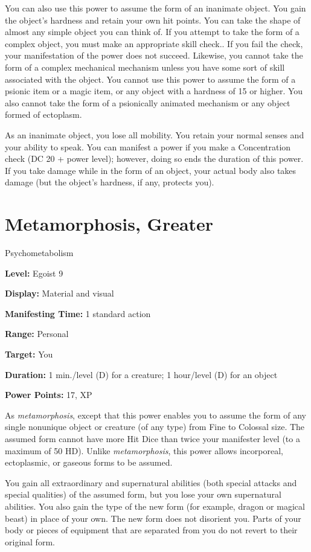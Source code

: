 \documentclass{article}
\begin{document}
You can also use this power to assume the form of an inanimate object. You gain 
the object's hardness and retain your own hit points. You can take the shape of 
almost any simple object you can think of. If you attempt to take the form of a 
complex object, you must make an appropriate skill check.. If you fail the check, 
your manifestation of the power does not succeed. Likewise, you cannot take the 
form of a complex mechanical mechanism unless you have some sort of skill associated 
with the object. You cannot use this power to assume the form of a psionic item 
or a magic item, or any object with a hardness of 15 or higher. You also cannot 
take the form of a psionically animated mechanism or any object formed of ectoplasm.

As an inanimate object, you lose all mobility. You retain your normal senses and 
your ability to speak. You can manifest a power if you make a Concentration check 
(DC 20 + power level); however, doing so ends the duration of this power. If you 
take damage while in the form of an object, your actual body also takes damage 
(but the object's hardness, if any, protects you).

\vspace{12pt}
\section*{Metamorphosis, Greater}

Psychometabolism

\textbf{Level:} Egoist 9

\textbf{Display:} Material and visual

\textbf{Manifesting Time:} 1 standard action

\textbf{Range:} Personal

\textbf{Target:} You

\textbf{Duration:} 1 min./level (D) for a creature; 1 hour/level (D) for an object

\textbf{Power Points:} 17, XP

As \textit{metamorphosis}, except that this power enables you to assume the form 
of any single nonunique object or creature (of any type) from Fine to Colossal 
size. The assumed form cannot have more Hit Dice than twice your manifester level 
(to a maximum of 50 HD). Unlike \textit{metamorphosis}, this power allows incorporeal, 
ectoplasmic, or gaseous forms to be assumed.

You gain all extraordinary and supernatural abilities (both special attacks and 
special qualities) of the assumed form, but you lose your own supernatural abilities. 
You also gain the type of the new form (for example, dragon or magical beast) in 
place of your own. The new form does not disorient you. Parts of your body or pieces 
of equipment that are separated from you do not revert to their original form.
\end{document}
